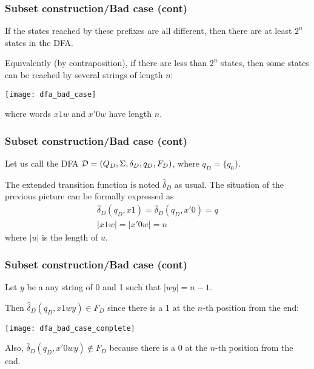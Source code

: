% 
\begin{frame}
\frametitle{Subset construction/Bad case (cont)}

If the states reached by these prefixes are all different, then there
are at least \(2^n\) states in the DFA.

\bigskip

Equivalently (by contraposition), if there are less than \(2^n\)
states, then some states can be reached by several strings of length
\(n\):
\begin{center}
\texttt{[image: dfa\_bad\_case]}
\end{center}
where words \(x1w\) and \(x'0w\) have length \(n\).

\end{frame}

% 
\begin{frame}
\frametitle{Subset construction/Bad case (cont)}

Let us call the DFA \({\cal D} = (Q_D, \Sigma, \delta_D, q_D, F_D)\),
where \(q_D=\{q_0\}\). 

\bigskip

The extended transition function is noted \(\hat{\delta}_D\) as
usual. The situation of the previous picture can be formally expressed
as 
\begin{gather}
\hat{\delta}_D (q_D, x1) = \hat{\delta}_D (q_D, x'0) = q \label{ext:1}\\
\lvert{x1w}\lvert = \lvert{x'0w}\lvert = n
\end{gather}
where \(\lvert{u}\lvert\) is the length of \(u\).

\end{frame}

% 
\begin{frame}
\frametitle{Subset construction/Bad case (cont)}

Let \(y\) be a any string of 0 and 1 such that \(\lvert{wy}\lvert = n
- 1\).

\bigskip

Then \(\hat{\delta}_D(q_D, x1wy) \in F_D\) since there is a 1 at the
\(n\)-th position from the end:
\begin{center}
\texttt{[image: dfa\_bad\_case\_complete]}
\end{center}
Also, \(\hat{\delta}_D(q_D,x'0wy) \not\in F_D\) because there is a 0
at the \(n\)-th position from the end.

\end{frame}

